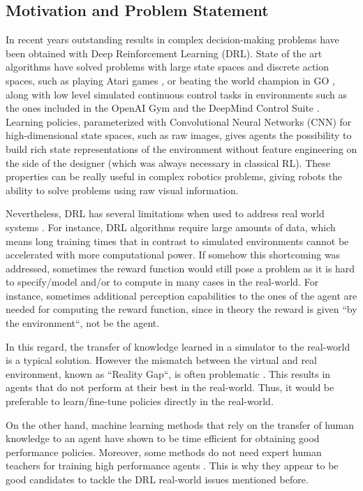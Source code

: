 \begin{intro}
\section{Motivation and Problem Statement}
In  recent years outstanding results in complex decision-making problems have been obtained with Deep Reinforcement Learning (DRL). State of the art algorithms have solved problems with large state spaces and discrete action spaces, such as playing Atari games \cite{atari}, or beating the world champion in GO \cite{Silver2016}, along with low level simulated continuous control tasks in environments such as the ones included in the OpenAI Gym \cite{brockman2016openai} and the DeepMind Control Suite \cite{tassa2018deepmind}. Learning policies, parameterized with Convolutional Neural Networks (CNN) for high-dimensional state spaces, such as raw images, gives agents the possibility to build rich state representations of the environment without feature engineering on the side of the designer (which was always necessary in classical RL). These properties can be really useful in complex robotics problems, giving robots the ability to solve problems using raw visual information. 

Nevertheless, DRL has several limitations when used to address real world systems \cite{Gu2017}. For instance, DRL algorithms require large amounts of data, which means long training times that in contrast to simulated environments cannot be accelerated with more computational power. If somehow this shortcoming was addressed, sometimes the reward function would still pose a problem as it is hard to specify/model and/or to compute in many cases in the real-world. For instance, sometimes additional perception capabilities to the ones of the agent are needed for computing the reward function, since in theory the reward is given ``by the environment``, not be the agent.

In this regard, the transfer of knowledge learned in a simulator to the real-world is a typical solution. However the mismatch between the virtual and real environment, known as ``Reality Gap``, is often problematic \cite{koos2013transferability}. This results in agents that do not perform at their best in the real-world. Thus, it would be preferable to learn/fine-tune policies directly in the real-world.

On the other hand, machine learning methods that rely on the transfer of human knowledge to an agent have shown to be time efficient for obtaining good performance policies. Moreover, some methods do not need expert human teachers for training high performance agents \cite{akrour2011preference,Knox:2009:ISA:1597735.1597738,Celemin2018AnInteractive}. This is why they appear to be good candidates to tackle the DRL real-world issues mentioned before. 


\end{intro}
